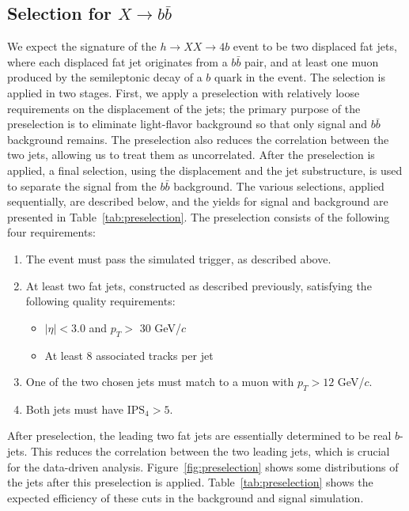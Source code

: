\documentclass{JHEP3}
\newcommand{\IPS}{\textrm{IPS}}
\begin{document}
\subsection{Selection for $X\rightarrow b\bar{b}$}

We expect the signature of the $h \rightarrow XX \rightarrow 4b$ event to be two displaced fat jets, where each
displaced fat jet originates from a $b\bar{b}$ pair, and at least one muon produced 
by the semileptonic decay of a $b$ quark in the event. 
The selection is applied in two stages. First, we apply a preselection with relatively loose requirements
on the displacement of the jets; the primary purpose of the preselection is to eliminate light-flavor
background so that only signal and $b\bar{b}$ background remains. The preselection also reduces the
correlation between the two jets, allowing us to treat them as uncorrelated. After the preselection is
applied, a final selection, using the displacement and the jet substructure, is used to separate the
signal from the $b\bar{b}$ background.
The various selections, applied sequentially, are described below, and the yields for
signal and background are presented in Table~\ref{tab:preselection}. The preselection consists of the following four requirements:

\begin{enumerate}[Cut 1:]
\item The event must pass the simulated trigger, as described above.
\item At least two fat jets, constructed as described previously, satisfying the following quality requirements:
  \begin{itemize}
    \item $|\eta| < 3.0$ and $p_T >$ 30 GeV/$c$
    \item At least 8 associated tracks per jet
  \end{itemize}
\item One of the two chosen jets must match to a muon with $p_T > 12$ GeV/$c$.
\item Both jets must have $\IPS_{4} > 5$.
\end{enumerate}

After preselection, the leading two fat jets are essentially determined to be real $b$-jets. This reduces the
correlation between the two leading jets, which is crucial for the data-driven analysis. Figure~\ref{fig:preselection} shows some distributions of the jets after this preselection is
applied. Table~\ref{tab:preselection} shows the expected efficiency of these cuts in the background and
signal simulation.
\end{document}
